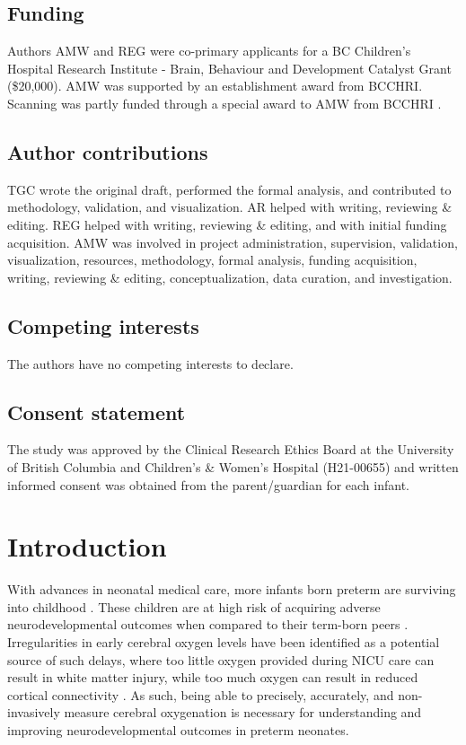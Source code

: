 \documentclass[
true
]{sn-jnl}
\begin{document}
\subsection{Funding}\label{funding}

Authors AMW and REG were co-primary applicants for a BC Children's
Hospital Research Institute - Brain, Behaviour and Development Catalyst
Grant (\$20,000). AMW was supported by an establishment award from
BCCHRI. Scanning was partly funded through a special award to AMW from
BCCHRI .

\subsection{Author contributions}\label{author-contributions}

TGC wrote the original draft, performed the formal analysis, and
contributed to methodology, validation, and visualization. AR helped
with writing, reviewing \& editing. REG helped with writing, reviewing
\& editing, and with initial funding acquisition. AMW was involved in
project administration, supervision, validation, visualization,
resources, methodology, formal analysis, funding acquisition, writing,
reviewing \& editing, conceptualization, data curation, and
investigation.

\subsection{Competing interests}\label{competing-interests}

The authors have no competing interests to declare.

\subsection{Consent statement}\label{consent-statement}

The study was approved by the Clinical Research Ethics Board at the
University of British Columbia and Children's \& Women's Hospital
(H21-00655) and written informed consent was obtained from the
parent/guardian for each infant.

\newpage{}

\section{Introduction}\label{sec-intro}

With advances in neonatal medical care, more infants born preterm are
surviving into childhood \citep{mckenzieScaffoldingParentingHealth2022}.
These children are at high risk of acquiring adverse neurodevelopmental
outcomes when compared to their term-born peers
\citep{twilhaarCognitiveOutcomesChildren2018}. Irregularities in early
cerebral oxygen levels have been identified as a potential source of
such delays, where too little oxygen provided during NICU care can
result in white matter injury, while too much oxygen can result in
reduced cortical connectivity \citep{rantakariEarlyOxygenLevels2021}. As
such, being able to precisely, accurately, and non-invasively measure
cerebral oxygenation is necessary for understanding and improving
neurodevelopmental outcomes in preterm neonates.
\end{document}

